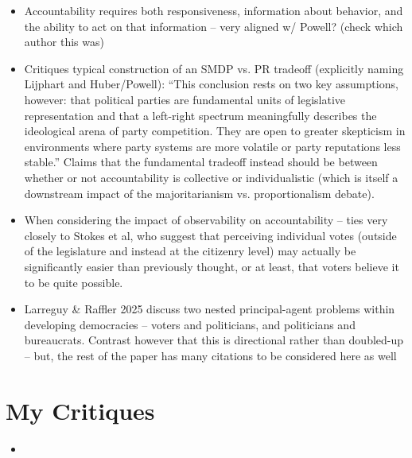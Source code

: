 \documentclass[12pt]{article}
\begin{document}
\begin{itemize}
    \item Accountability requires both responsiveness, information about behavior, and the ability to act on that information -- very aligned w/ Powell? (check which author this was)
    \item Critiques typical construction of an SMDP vs. PR tradeoff (explicitly naming Lijphart and Huber/Powell): ``This conclusion rests on two key assumptions, however: that political parties are fundamental units of legislative representation and that a left-right spectrum meaningfully describes the ideological arena of party competition. They are open to greater skepticism in environments where party systems are more volatile or party reputations less stable.'' Claims that the fundamental tradeoff instead should be between whether or not accountability is collective or individualistic (which is itself a downstream impact of the majoritarianism vs. proportionalism debate).
    \item When considering the impact of observability on accountability -- ties very closely to Stokes et al, who suggest that perceiving individual votes (outside of the legislature and instead at the citizenry level) may actually be significantly easier than previously thought, or at least, that voters believe it to be quite possible.
    \item Larreguy \& Raffler 2025 discuss two nested principal-agent problems within developing democracies -- voters and politicians, and politicians and bureaucrats. Contrast however that this is directional rather than doubled-up -- but, the rest of the paper has many citations to be considered here as well
\end{itemize}


\section{My Critiques}

\begin{itemize}
    \item 
\end{itemize}
\end{document}

